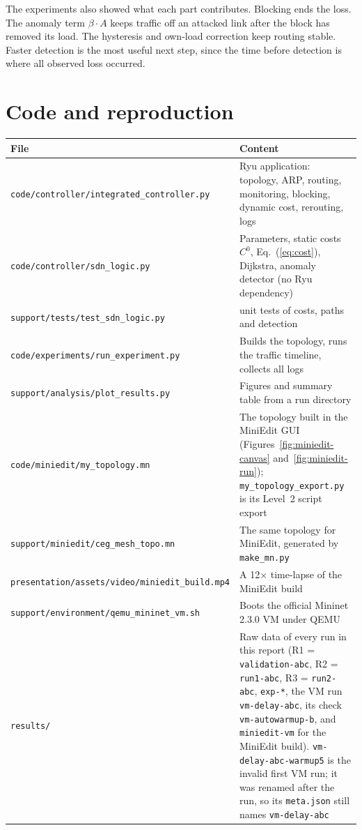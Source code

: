 \documentclass[11pt,a4paper]{article}
\newcommand{\code}[1]{\texttt{#1}}
\begin{document}
The experiments also showed what each part contributes. Blocking ends the loss. The anomaly term $\beta\cdot A$
keeps traffic off an attacked link after the block has removed its load. The hysteresis and own-load correction
keep routing stable. Faster detection is the most useful next step, since the time before detection is where all
observed loss occurred.

\appendix
\section{Code and reproduction}

\begin{table}[H]
  \centering
  \small
  \begin{tabularx}{\textwidth}{l >{\raggedright\arraybackslash}X}
    \toprule
    File & Content \\
    \midrule
    \code{code/controller/integrated\_controller.py} & Ryu application: topology, ARP, routing, monitoring, blocking,
      dynamic cost, rerouting, logs \\
    \code{code/controller/sdn\_logic.py} & Parameters, static costs $C^0$, Eq.~(\ref{eq:cost}), Dijkstra, anomaly
      detector (no Ryu dependency) \\
    \code{support/tests/test\_sdn\_logic.py} & 18 unit tests of costs, paths and detection \\
    \code{code/experiments/run\_experiment.py} & Builds the topology, runs the traffic timeline, collects all logs \\
    \code{support/analysis/plot\_results.py} & Figures and summary table from a run directory \\
    \code{code/miniedit/my\_topology.mn} & The topology built in the MiniEdit GUI (Figures~\ref{fig:miniedit-canvas}
      and~\ref{fig:miniedit-run}); \code{my\_topology\_export.py} is its Level~2 script export \\
    \code{support/miniedit/ceg\_mesh\_topo.mn} & The same topology for MiniEdit, generated by \code{make\_mn.py} \\
    \code{presentation/assets/video/miniedit\_build.mp4} & A 12$\times$ time-lapse of the MiniEdit build \\
    \code{support/environment/qemu\_mininet\_vm.sh} & Boots the official Mininet 2.3.0 VM under QEMU \\
    \code{results/} & Raw data of every run in this report (R1 = \code{validation-abc}, R2 = \code{run1-abc},
      R3 = \code{run2-abc}, \code{exp-*}, the VM run \code{vm-delay-abc}, its check \code{vm-autowarmup-b}, and \code{miniedit-vm} for the MiniEdit
      build). \code{vm-delay-abc-warmup5} is the invalid first VM run; it was renamed after the run, so its
      \code{meta.json} still names \code{vm-delay-abc} \\
    \bottomrule
  \end{tabularx}
\end{table}
\end{document}
